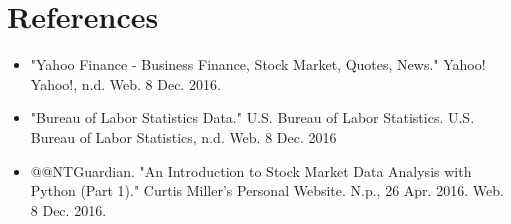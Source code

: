 \documentclass[12pt]{report}
\begin{document}
\section*{References}

 
\begin{itemize}
\item "Yahoo Finance - Business Finance, Stock Market, Quotes, News." Yahoo! Yahoo!, n.d. Web. 8 Dec. 2016.

\item "Bureau of Labor Statistics Data." U.S. Bureau of Labor Statistics. U.S. Bureau of Labor Statistics, n.d. Web. 8 Dec. 2016 
\item @@NTGuardian. "An Introduction to Stock Market Data Analysis with Python (Part 1)." Curtis Miller's Personal Website. N.p., 26 Apr. 2016. Web. 8 Dec. 2016.

\end{itemize} 
 
\end{document}

